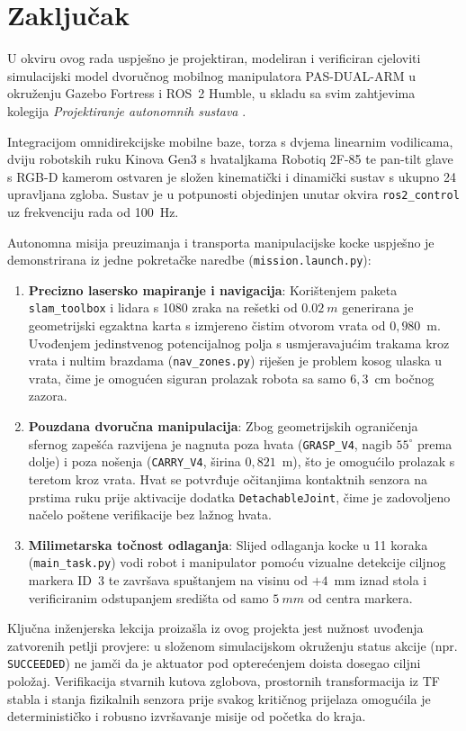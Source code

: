 \section{Zaključak}
\label{sec:zakljucak}

U okviru ovog rada uspješno je projektiran, modeliran i verificiran cjeloviti simulacijski model
dvoručnog mobilnog manipulatora PAS-DUAL-ARM u okruženju Gazebo Fortress i ROS~2 Humble, u skladu sa
svim zahtjevima kolegija \emph{Projektiranje autonomnih sustava} \cite{zadatak2025, mail2026}.

Integracijom omnidirekcijske mobilne baze, torza s dvjema linearnim vodilicama, dviju robotskih ruku
Kinova Gen3 s hvataljkama Robotiq 2F-85 te pan-tilt glave s RGB-D kamerom ostvaren je složen
kinematički i dinamički sustav s ukupno 24 upravljana zgloba. Sustav je u potpunosti objedinjen unutar
okvira \texttt{ros2\_control} uz frekvenciju rada od 100~Hz.

Autonomna misija preuzimanja i transporta manipulacijske kocke uspješno je demonstrirana iz jedne
pokretačke naredbe (\texttt{mission.launch.py}):
\begin{enumerate}
  \item \textbf{Precizno lasersko mapiranje i navigacija}: Korištenjem paketa \texttt{slam\_toolbox}
    i lidara s 1080 zraka na rešetki od $\SI{0.02}{m}$ generirana je geometrijski egzaktna karta s
    izmjereno čistim otvorom vrata od $0{,}980$~m. Uvođenjem jedinstvenog potencijalnog polja s
    usmjeravajućim trakama kroz vrata i nultim brazdama (\texttt{nav\_zones.py}) riješen je problem
    kosog ulaska u vrata, čime je omogućen siguran prolazak robota sa samo $6{,}3$~cm bočnog zazora.
  \item \textbf{Pouzdana dvoručna manipulacija}: Zbog geometrijskih ograničenja sfernog zapešća
    razvijena je nagnuta poza hvata (\texttt{GRASP\_V4}, nagib $55^\circ$ prema dolje) i poza nošenja
    (\texttt{CARRY\_V4}, širina $0{,}821$~m), što je omogućilo prolazak s teretom kroz vrata. Hvat se
    potvrđuje očitanjima kontaktnih senzora na prstima ruku prije aktivacije dodatka
    \texttt{DetachableJoint}, čime je zadovoljeno načelo poštene verifikacije bez lažnog hvata.
  \item \textbf{Milimetarska točnost odlaganja}: Slijed odlaganja kocke u 11 koraka
    (\texttt{main\_task.py}) vodi robot i manipulator pomoću vizualne detekcije ciljnog markera ID~3
    te završava spuštanjem na visinu od $+4$~mm iznad stola i verificiranim odstupanjem središta od
    samo $\SI{5}{mm}$ od centra markera.
\end{enumerate}

Ključna inženjerska lekcija proizašla iz ovog projekta jest nužnost uvođenja zatvorenih petlji
provjere: u složenom simulacijskom okruženju status akcije (npr. \texttt{SUCCEEDED}) ne jamči da je
aktuator pod opterećenjem doista dosegao ciljni položaj. Verifikacija stvarnih kutova zglobova,
prostornih transformacija iz TF stabla i stanja fizikalnih senzora prije svakog kritičnog prijelaza
omogućila je determinističko i robusno izvršavanje misije od početka do kraja.
